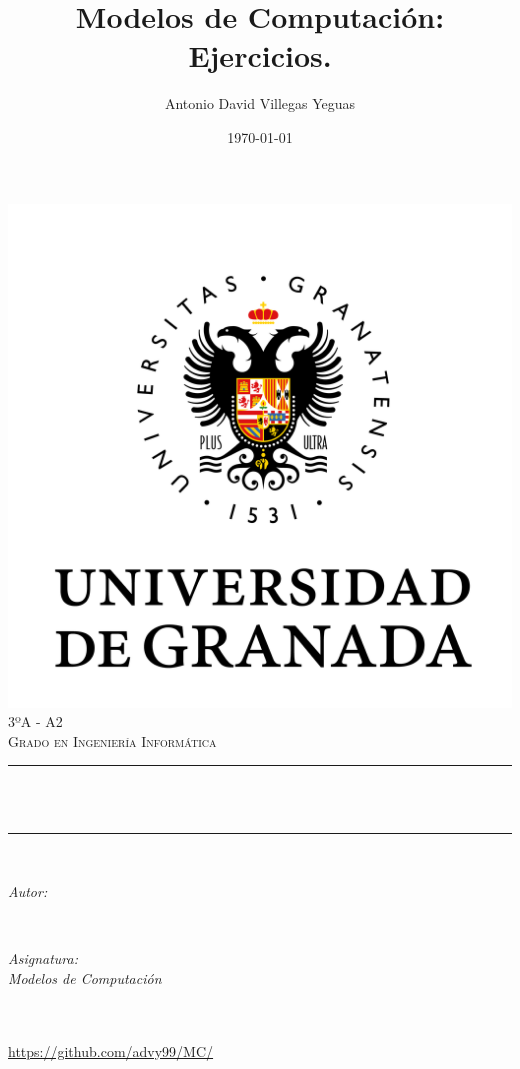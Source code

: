 \documentclass[12pt, spanish]{article}
\title{Modelos de Computación:\\
Ejercicios. \hspace{0.05cm} }
\author{Antonio David Villegas Yeguas}
\date{\today}
\makeatletter
\let\thetitle\@title
\let\theauthor\@author
\let\thedate\@date
\makeatother
\begin{document}

\begin{titlepage}
    \centering
    \vspace*{0.5 cm}
    \includegraphics[scale = 0.50]{ugr.png}\\[1.0 cm]
    \textsc{\large 3ºA - A2}\\[0.5 cm]            
    \textsc{\large Grado en Ingeniería Informática}\\[0.5 cm]              
    \rule{\linewidth}{0.2 mm} \\[0.2 cm]
    { \huge \bfseries \thetitle}\\
    \rule{\linewidth}{0.2 mm} \\[1 cm]
    
    \begin{minipage}{0.4\textwidth}
        \begin{flushleft} \large
            \emph{Autor:}\\
            \theauthor
            \end{flushleft}
            \end{minipage}~
            \begin{minipage}{0.4\textwidth}
            \begin{flushright} \large
            \emph{Asignatura: \\
            Modelos de Computación}                   
        \end{flushright}
    \end{minipage}\\[0.5cm]
  
    {\large \thedate}\\[0.5cm]
    {\url{https://github.com/advy99/MC/}}
    {\doclicenseThis}
 	
    \vfill
    
\end{titlepage}
\end{document}
